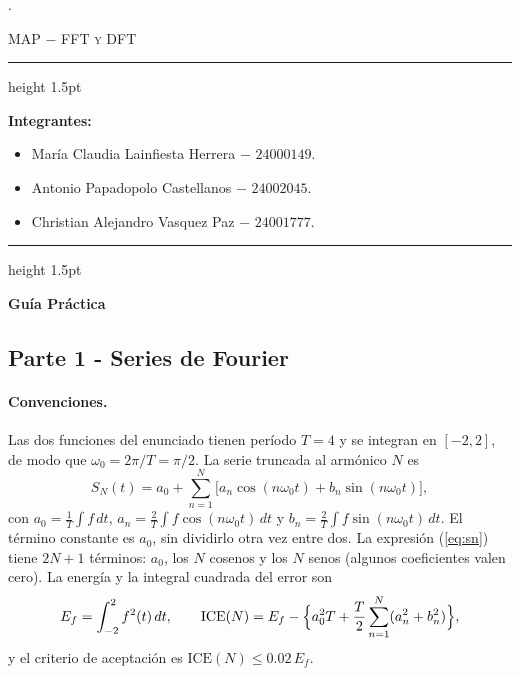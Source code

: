 \documentclass[11pt]{article}
\begin{document}
{\color{white}.}
\vspace{3 in}

\begin{center}
\Huge
\textsc{MAP $-$ FFT y DFT}
\end{center}

\vspace{3 in}
\hrule height 1.5pt
\vspace{0.1 in}

{\large
\noindent\textbf{Integrantes:}

\begin{itemize}[nolistsep]
    \item María Claudia Lainfiesta Herrera $-$ $24000149$.
    \item Antonio Papadopolo Castellanos $-$ $24002045$.
    \item Christian Alejandro Vasquez Paz $-$ $24001777$.
\end{itemize}
}

\vspace{0.2 in}
\hrule height 1.5pt

\newpage
\vspace{0.1 in}



\begin{center}
\Large
\textbf{Guía Práctica}
\end{center}

\subsection*{Parte 1 - Series de Fourier}

\noindent

\paragraph{Convenciones.}
Las dos funciones del enunciado tienen período $T=4$ y se integran en
$[-2,2]$, de modo que $\omega_0=2\pi/T=\pi/2$. La serie truncada al armónico $N$ es
\begin{equation}
 S_N(t)=a_0+\sum_{n=1}^{N}\bigl[a_n\cos(n\omega_0 t)+b_n\sin(n\omega_0 t)\bigr],
 \label{eq:sn}
\end{equation}
con $a_0=\frac1T\int f\,dt$, $a_n=\frac2T\int f\cos(n\omega_0t)\,dt$ y
$b_n=\frac2T\int f\sin(n\omega_0t)\,dt$. El término constante es $a_0$, sin dividirlo otra vez entre dos.
La expresión (\ref{eq:sn}) tiene $2N+1$ términos: $a_0$, los $N$ cosenos y los $N$ senos
(algunos coeficientes valen cero). La energía y la integral cuadrada del error son
\begin{equation}
 E_f=\int_{-2}^{2}f^2(t)\,dt,\qquad
 \mathrm{ICE}(N)=E_f-\Bigl\{a_0^2T+\frac T2\sum_{n=1}^{N}(a_n^2+b_n^2)\Bigr\},
\end{equation}
y el criterio de aceptación es $\mathrm{ICE}(N)\le0.02\,E_f$.
\end{document}
